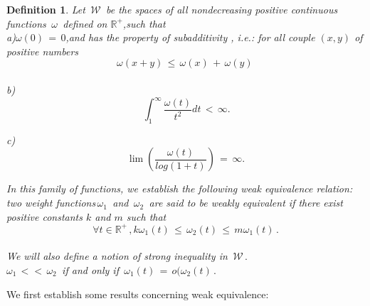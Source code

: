 \documentclass[12pt,a4paper]{amsart}
\newcommand{\RR}{\mathbb R}
\newtheorem{definition}[theorem]{Definition}
\begin{document}
\begin{definition}
Let $\,\mathcal{W}\,$ be the spaces of all nondecreasing positive  continuous functions $\,\omega\,$ defined on
 $\RR^+$,such that 
 \\
 a)$\omega(0)\,=\,0 $,and has the property of subadditivity , i.e.: for all couple $(x,y)$ of positive numbers 
 $$\omega(x+y)\,\leq\,\omega(x)\,+\,\omega(y)\,$$
 \\

b) $$\,\int_1^\infty \frac{\omega(t)}{t^2}dt\,<\,\infty . $$



c) $$\lim(\frac{\omega(t)}{log(1+t)})\,=\,\infty.$$


In this family of functions, we establish the following weak equivalence relation:
 two weight functions$\,\omega_1\,$ and
$ \,\omega_2 \,$ are said to be weakly equivalent if there exist positive constants $k$ and $m$ such that 
$$\forall t \in \RR^+\,, k\omega_1(t) \,\leq\,\omega_2(t)\,
\leq\,m\omega_1(t)\,.$$
\\
 We will also define a notion of strong inequality in
  $\,\mathcal{W}\,.$
  \\
  $\omega_1\,<<\,\omega_2\,$ if and only if 
  $\,\omega_1(t) \,=\,o(\omega_2(t)\,.$
  
  \end{definition}
 
  We first establish some results concerning weak equivalence:
  
\end{document}
